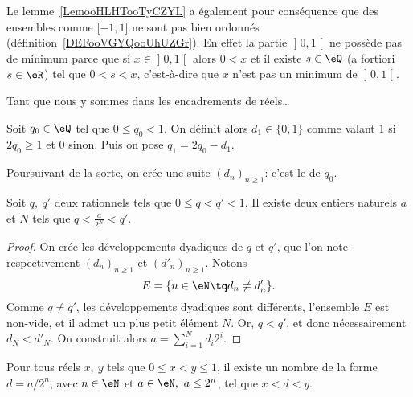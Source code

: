 \begin{remark}      \label{REMooXOIOooHjwMvA}
	Le lemme~\ref{LemooHLHTooTyCZYL} a également pour conséquence que des ensembles comme \( \mathopen[ -1 , 1 \mathclose]\) ne sont pas bien ordonnés (définition~\ref{DEFooVGYQooUhUZGr}). En effet la partie \( \mathopen] 0 , 1 \mathclose[\) ne possède pas de minimum parce que si \( x\in \mathopen] 0 , 1 \mathclose[\) alors \( 0<x\) et il existe \( s\in \eQ\) (a fortiori \( s\in \eR\)) tel que \( 0<s<x\), c'est-à-dire que \( x\) n'est pas un minimum de \( \mathopen] 0 , 1 \mathclose[\).
\end{remark}

Tant que nous y sommes dans les encadrements de réels\dots
\begin{normaltext}
	Soit \(q_0 \in \eQ \) tel que \( 0 \leq q_0 < 1 \). On définit alors \( d_1 \in \{0, 1\} \) comme valant \( 1 \) si \( 2 q_0 \geq 1 \) et \(0 \) sinon. Puis on pose \( q_1 = 2 q_0 - d_1 \).

	Poursuivant de la sorte, on crée une suite \( (d_n)_{n\geq 1} \): c'est le  de \( q_0 \).
\end{normaltext}

\begin{lemma}        \label{LEMooRSLIooVrZMxM}
	Soit \( q,\ q' \) deux rationnels tels que \( 0 \leq q < q' < 1 \). Il existe deux entiers naturels \( a \) et \( N \) tels que \( q < \frac a {2^N} < q' \).
\end{lemma}
\begin{proof}
	On crée les développements dyadiques de \( q \) et \( q' \), que l'on note respectivement \( (d_n)_{n\geq 1} \) et \( (d'_n)_{n\geq 1} \). Notons
	\begin{equation}
		E = \{ n \in \eN \tq d_n \neq d'_n \}.
	\end{equation}
	Comme \( q \neq q' \), les développements dyadiques sont différents, l'ensemble \(E\) est non-vide, et il admet un plus petit élément \(N \). Or, \( q < q' \), et donc nécessairement \( d_N < d'_N \). On construit alors \( a = \sum_{i=1}^{N} d_i 2^i \).
\end{proof}

\begin{corollary}\label{CorDensiteDyadiques}
	Pour tous réels \(x,\ y\) tels que \( 0 \leq x < y \leq 1 \), il existe un nombre de la forme \( d = a / 2^n \), avec \( n \in \eN \) et \( a \in \eN,\ a \leq 2^n\), tel que \( x < d < y \).
\end{corollary}


